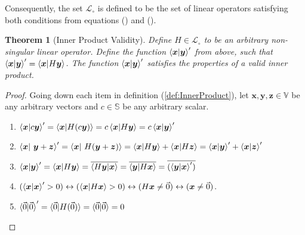 \documentclass{article}
\newcommand{\B}[1]{\boldsymbol{#1}}
\newtheorem{theorem}{Theorem}[section]
\theoremstyle{definition}
\theoremstyle{remark}
\newtheorem*{remark}{Remark}
\begin{document}
Consequently, the set $\mathcal{L}_\circ$ is defined to be the set of linear operators satisfying both 
conditions from equations () and ().

\begin{theorem}[Inner Product Validity]
  Define $H \in \mathcal{L}_\circ$ to be an arbitrary non-singular linear
  operator. Define the function $\braket{\B{x}|\B{y}}^\prime$ from above, such that
  $\braket{\B{x}|\B{y}}^\prime = \braket{ \B{x} | H \B{y}}$.
  The function $\braket{\B{x}|\B{y}}^\prime$  satisfies the properties of a valid inner product.
\end{theorem}

\begin{proof}
  Going down each item in definition (\ref{def:InnerProduct}), let $\B{x}, \B{y}, \B{z} \in \mathbb{V}$ be any arbitrary vectors and $c \in \mathbb{S}$ be any arbitrary scalar.
  \begin{enumerate}
    \item $\braket{\B{x}|c\B{y}}^\prime = \braket{ \B{x} | H (c \B{y})} = c \braket{ \B{x} | H \B{y}} = c\braket{ \B{x} | \B{y}}^\prime$
    \item $\braket{\B{x}| ~ \B{y} + \B{z}}^\prime = \braket{ \B{x}| ~ H (\B{y} + \B{z})} =  \braket{ \B{x}| H \B{y}} + \braket{ \B{x} | H \B{z}}=\braket{\B{x}| \B{y}}^\prime + \braket{\B{x}|\B{z}}^\prime$
    \item $\braket{\B{x}| \B{y}}^\prime = \braket{  \B{x} | H \B{y}} = \overline{\braket{ H \B{y} |  \B{x}}} = \overline{\braket{  \B{y} | H \B{x}}} = \overline{(\braket{\B{y}|\B{x}}^\prime)}$
    \item $(\braket{\B{x}| \B{x}}^\prime > 0 ) \leftrightarrow (\braket{ \B{x}| H \B{x}} > 0) \leftrightarrow  (H \B{x} \neq \vec{0})  \leftrightarrow (\B{x} \neq \vec{0})$.
    \item $\braket{\vec{0}|\vec{0}}^\prime = \braket{ \vec{0} | H (\vec{0})} = \braket{\vec{0}|\vec{0}} = 0 $
  \end{enumerate}

\end{proof}


\end{document}
